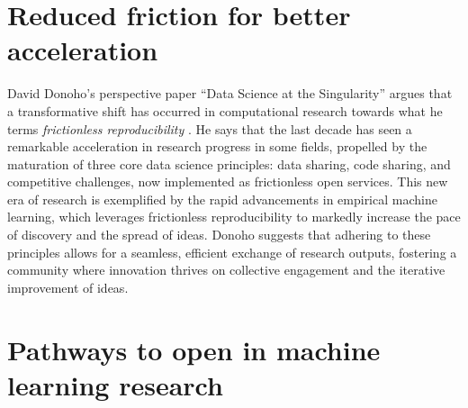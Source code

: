 \documentclass[]{hdsr}
\begin{document}
\section*{Reduced friction for better acceleration}
\label{intro}
David Donoho's perspective paper ``Data Science at the Singularity'' argues that a transformative shift has occurred in computational research towards what he terms \emph{frictionless reproducibility} \citep{donoho2024data}. He says that the last decade has seen a remarkable acceleration in research progress in some fields, propelled by the maturation of three core data science principles: data sharing, code sharing, and competitive challenges, now implemented as frictionless open services. This new era of research is exemplified by the rapid advancements in empirical machine learning, which leverages frictionless reproducibility to markedly increase the pace of discovery and the spread of ideas. Donoho suggests that adhering to these principles allows for a seamless, efficient exchange of research outputs, fostering a community where innovation thrives on collective engagement and the iterative improvement of ideas.


\restoregeometry
{}

\section*{Pathways to open in machine learning research}
\end{document}
